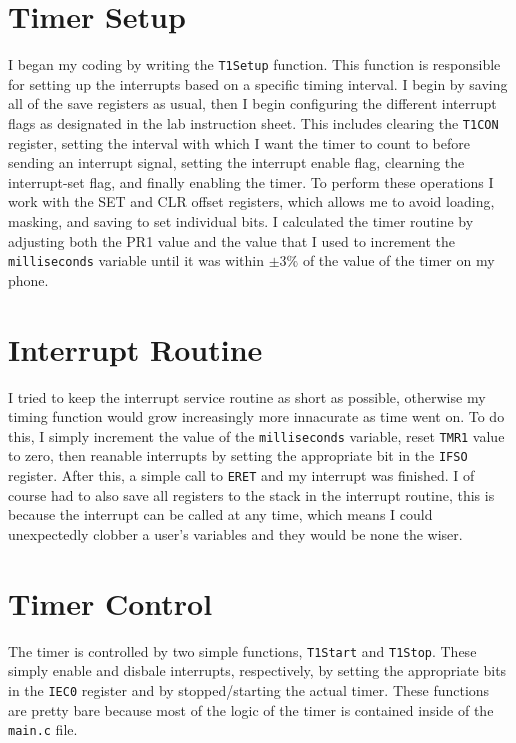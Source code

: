 \documentclass[a4paper,11pt]{article}
\begin{document}
\section{Timer Setup}
I began my coding by writing the \texttt{T1Setup} function. This function is responsible for setting up the interrupts based on a specific timing interval. I begin by saving all of the save registers as usual, then I begin configuring the different interrupt flags as designated in the lab instruction sheet. This includes clearing the \texttt{T1CON} register, setting the interval with which I want the timer to count to before sending an interrupt signal, setting the interrupt enable flag, clearning the interrupt-set flag, and finally enabling the timer. To perform these operations I work with the SET and CLR offset registers, which allows me to avoid loading, masking, and saving to set individual bits. I calculated the timer routine by adjusting both the PR1 value and the value that I used to increment the \texttt{milliseconds} variable until it was within $\pm3\%$ of the value of the timer on my phone. 

\section{Interrupt Routine}
I tried to keep the interrupt service routine as short as possible, otherwise my timing function would grow increasingly more innacurate as time went on. To do this, I simply increment the value of the \texttt{milliseconds} variable, reset \texttt{TMR1} value to zero, then reanable interrupts by setting the appropriate bit in the \texttt{IFSO} register. After this, a simple call to \texttt{ERET} and my interrupt was finished. I of course had to also save all registers to the stack in the interrupt routine, this is because the interrupt can be called at any time, which means I could unexpectedly clobber a user's variables and they would be none the wiser.

\section{Timer Control}
The timer is controlled by two simple functions, \texttt{T1Start} and \texttt{T1Stop}. These simply enable and disbale interrupts, respectively, by setting the appropriate bits in the \texttt{IEC0} register and by stopped/starting the actual timer. These functions are pretty bare because most of the logic of the timer is contained inside of the \texttt{main.c} file.
\end{document}

